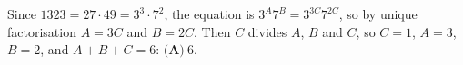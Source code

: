 Since $1323=27\cdot49=3^3\cdot7^2$, the equation is $3^A7^B=3^{3C}7^{2C}$, so by unique factorisation $A=3C$ and $B=2C$. Then $C$ divides $A$, $B$ and $C$, so $C=1$, $A=3$, $B=2$, and $A+B+C=6$: $\boxed{\textbf{(A)}\ 6}$.
